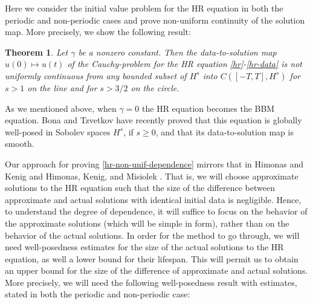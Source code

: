\documentclass[12pt,reqno]{amsart}
\theoremstyle{plain}  %
\newtheorem{theorem}{Theorem}
\theoremstyle{definition}
\begin{document}
Here we consider the initial value problem for the HR equation
in both the periodic and non-periodic cases
and prove non-uniform  continuity of the solution map. 
More precisely, we show the following result:
%
%
%
%
%
%
\begin{theorem}
\label{hr-non-unif-dependence}
Let $\gamma$ be a nonzero constant. Then 
the data-to-solution map $u(0) \mapsto u(t)$ of the Cauchy-problem
for the HR equation
\eqref{hr}-\eqref{hr-data}
is not uniformly continuous
from any bounded subset of  $H^s$ into $C([-T, T], H^s)$
for $s>1$ on the line  and for $s>3/2$ on the circle.
%
\end{theorem}
%
%
%
As we mentioned above, when  $\gamma=0$ the HR equation
 becomes the BBM equation.
 Bona and Tzvetkov \cite{Bona_2009_Sharp-well-pose} have recently proved  that this equation  
is globally well-posed in  Sobolev spaces $H^s$, if $s \ge 0$,
and that its data-to-solution map is smooth.

%
Our approach  for proving \autoref{hr-non-unif-dependence}  
mirrors  that in Himonas and Kenig \cite{Himonas_2009_Non-uniform-dep} and 
Himonas, Kenig, and Misiolek \cite{Himonas_2009_Non-uniform-dep-per}.
That is, we will choose 
approximate solutions to the HR equation such that the size of the difference between approximate and actual solutions with 
identical initial data is negligible. Hence, to understand the degree of 
dependence, it will suffice to focus on the behavior of the approximate 
solutions (which will be simple in form), rather than on the behavior of the 
actual solutions. In order for the method to go through, we will 
need well-posedness estimates for  the size of the 
actual solutions to the HR equation, as well a 
lower bound for their lifespan. This will permit us to obtain an upper 
bound for the size of the difference of approximate and actual solutions. 
More precisely, we will need the following well-posedness result  with estimates,  
stated in both the  periodic and non-periodic case:
\end{document}
